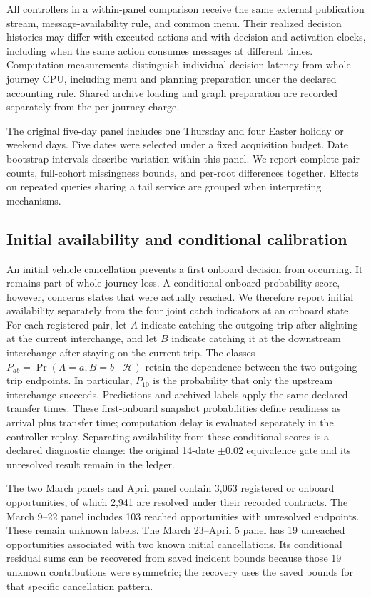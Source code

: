 \documentclass[preprint,12pt,authoryear]{elsarticle}
\begin{document}
All controllers in a within-panel comparison receive the same external
publication stream, message-availability rule, and common menu. Their realized
decision histories may differ with executed actions and with decision and
activation clocks, including when the same action consumes messages at different
times. Computation measurements distinguish individual
decision latency from whole-journey CPU, including menu and planning preparation
under the declared accounting rule. Shared archive loading and graph preparation
are recorded separately from the per-journey charge.

The original five-day panel includes one Thursday and four Easter holiday or
weekend days. Five dates were selected under a fixed acquisition budget. Date
bootstrap intervals describe variation within this panel. We report complete-pair
counts, full-cohort missingness bounds, and per-root differences together.
Effects on repeated queries sharing a tail service are grouped when interpreting
mechanisms.

\subsection{Initial availability and conditional calibration}
An initial vehicle cancellation prevents a first onboard decision from occurring.
It remains part of whole-journey loss. A conditional onboard probability score,
however, concerns states that were actually reached. We therefore report initial
availability separately from the four joint catch indicators at an onboard
state. For each registered pair, let $A$ indicate catching the outgoing trip
after alighting at the current interchange, and let $B$ indicate catching it at
the downstream interchange after staying on the current trip. The classes
$P_{ab}=\Pr(A=a,B=b\mid\mathcal H)$ retain the dependence between the two
outgoing-trip endpoints. In particular, $P_{10}$ is the probability that only the
upstream interchange succeeds. Predictions and archived labels apply the same
declared transfer times. These first-onboard snapshot probabilities define
readiness as arrival plus transfer time; computation delay is evaluated
separately in the controller replay. Separating availability from these conditional scores
is a declared diagnostic change: the original
14-date $\pm0.02$ equivalence gate and its unresolved result remain in the ledger.

The two March panels and April panel contain 3,063 registered or
onboard opportunities, of which 2,941 are resolved under their
recorded contracts. The March 9--22 panel includes 103 reached
opportunities with unresolved endpoints. These remain unknown labels. The March
23--April 5 panel has 19 unreached opportunities associated with two known initial
cancellations. Its conditional residual sums can be recovered from saved
incident bounds because those 19 unknown contributions were symmetric; the
recovery uses the saved bounds for that specific cancellation pattern.
\end{document}
